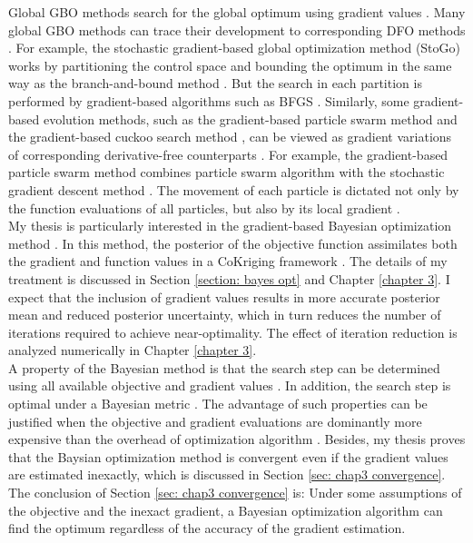 Global GBO methods search for the global optimum using gradient values \cite{opt via sim review, nonlinear program}.
Many global GBO methods can trace their development to corresponding DFO methods \cite{stogo 1, stogo 2, grad particle swarm, grad cuckoo, grad coKriging}. 
For example, the stochastic gradient-based global optimization method (StoGo) 
\cite{stogo 1, stogo 2} works by partitioning the control space and bounding the optimum in the same way 
as the branch-and-bound method \cite{Branch and Bound}. But the search in each partition is performed
by gradient-based algorithms such as BFGS \cite{quasiNewton}. 
Similarly, some gradient-based evolution methods,
such as the gradient-based particle swarm method \cite{grad particle swarm} 
and the gradient-based cuckoo search method \cite{grad cuckoo},
can be viewed as gradient variations of corresponding derivative-free counterparts \cite{particle swarm, cuckoo}.
For example, the gradient-based particle swarm method combines particle swarm algorithm with the
stochastic gradient descent method \cite{grad particle swarm}. 
The movement of each particle is dictated not only by the 
function evaluations of all particles, but also by its local gradient \cite{grad particle swarm}.\\

My thesis is particularly interested in the gradient-based Bayesian optimization method \cite{coKriging}.
In this method, the posterior of the objective function assimilates both the gradient 
and function values in a CoKriging framework \cite{derivative RKHS, coKriging}.
The details of my treatment is discussed in Section \ref{section: bayes opt} and
Chapter \ref{chapter 3}.
I expect that the inclusion of gradient values results in more accurate posterior mean and 
reduced posterior uncertainty, which in turn reduces the number of iterations required to
achieve near-optimality. The effect of iteration reduction 
is analyzed numerically in Chapter \ref{chapter 3}.\\

A property of the Bayesian method is that the search step can be determined using all 
available objective and gradient values \cite{practical Bayesian, jones1998}. In addition, the search step is optimal 
under a Bayesian metric \cite{practical Bayesian, jones1998}. 
The advantage of such properties can be justified
when the objective and gradient evaluations
are dominantly more expensive than the overhead of 
optimization algorithm \cite{practical Bayesian}. Besides, my thesis proves that the
Baysian optimization method is convergent even if the gradient values are estimated
inexactly, which is discussed in Section \ref{sec: chap3 convergence}.
The conclusion of Section \ref{sec: chap3 convergence} is: Under some assumptions of the objective and the inexact gradient, 
a Bayesian optimization algorithm can find the optimum regardless of the accuracy of the gradient estimation.\\

